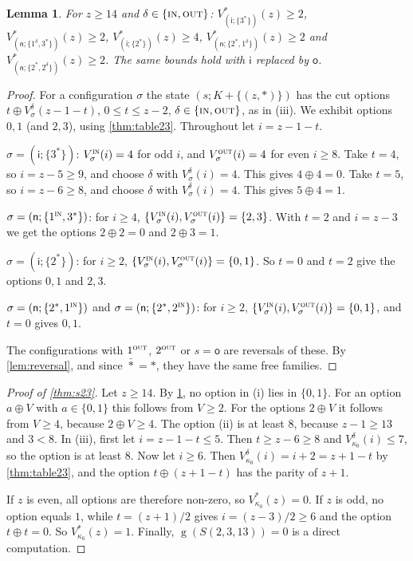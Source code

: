 \documentclass[11pt]{amsart}
\newtheorem{lemma}[theorem]{Lemma}
\theoremstyle{definition}
\theoremstyle{remark}
\newcommand{\gv}{\operatorname{g}}           %
\newcommand{\sn}{\mathsf{n}}
\newcommand{\si}{\mathsf{i}}
\newcommand{\so}{\mathsf{o}}
\newcommand{\Sp}{S}
\newcommand{\free}{\ast}
\newcommand{\IN}{\textup{\textsc{in}}}
\newcommand{\OUT}{\textup{\textsc{out}}}
\begin{document}
\begin{lemma}\label{lem:lowerbounds}
For $z\ge14$ and $\delta\in\{\IN,\OUT\}$:
$V^\free_{(\si;\{3^\free\})}(z)\ge2$, $V^\free_{(\sn;\{1^\delta,3^\free\})}(z)\ge2$, $V^\free_{(\si;\{2^\free\})}(z)\ge4$, $V^\free_{(\sn;\{2^\free,1^\delta\})}(z)\ge2$ and $V^\free_{(\sn;\{2^\free,2^\delta\})}(z)\ge2$. The same bounds hold with $\si$ replaced by $\so$.
\end{lemma}

\begin{proof}
For a configuration $\sigma$ the state $(s;K+\{(z,\free)\})$ has the cut options $t\oplus V^\delta_\sigma(z-1-t)$, $0\le t\le z-2$, $\delta\in\{\IN,\OUT\}$, as in (iii). We exhibit options $0,1$ (and $2,3$), using \cref{thm:table23}. Throughout let $i=z-1-t$.

$\sigma=(\si;\{3^\free\})$: $V^\IN_\sigma(i)=4$ for odd $i$, and $V^\OUT_\sigma(i)=4$ for even $i\ge8$. Take $t=4$, so $i=z-5\ge9$, and choose $\delta$ with $V^\delta_\sigma(i)=4$. This gives $4\oplus4=0$. Take $t=5$, so $i=z-6\ge8$, and choose $\delta$ with $V^\delta_\sigma(i)=4$. This gives $5\oplus4=1$.

$\sigma=(\sn;\{1^\IN,3^\free\})$: for $i\ge4$, $\{V^\IN_\sigma(i),V^\OUT_\sigma(i)\}=\{2,3\}$. With $t=2$ and $i=z-3$ we get the options $2\oplus2=0$ and $2\oplus3=1$.

$\sigma=(\si;\{2^\free\})$: for $i\ge2$, $\{V^\IN_\sigma(i),V^\OUT_\sigma(i)\}=\{0,1\}$. So $t=0$ and $t=2$ give the options $0,1$ and $2,3$.

$\sigma=(\sn;\{2^\free,1^\IN\})$ and $\sigma=(\sn;\{2^\free,2^\IN\})$: for $i\ge2$, $\{V^\IN_\sigma(i),V^\OUT_\sigma(i)\}=\{0,1\}$, and $t=0$ gives $0,1$.

The configurations with $1^\OUT$, $2^\OUT$ or $s=\so$ are reversals of these. By \cref{lem:reversal}, and since $\bar\free=\free$, they have the same free families.
\end{proof}

\begin{proof}[Proof of \cref{thm:s23}]
Let $z\ge14$. By \cref{lem:lowerbounds}, no option in (i) lies in $\{0,1\}$. For an option $a\oplus V$ with $a\in\{0,1\}$ this follows from $V\ge2$. For the options $2\oplus V$ it follows from $V\ge4$, because $2\oplus V\ge4$. The option (ii) is at least $8$, because $z-1\ge 13$ and $3<8$. In (iii), first let $i=z-1-t\le5$. Then $t\ge z-6\ge8$ and $V^\delta_{\kappa_0}(i)\le7$, so the option is at least $8$. Now let $i\ge6$. Then $V^\delta_{\kappa_0}(i)=i+2=z+1-t$ by \cref{thm:table23}, and the option $t\oplus(z+1-t)$ has the parity of $z+1$.

If $z$ is even, all options are therefore non-zero, so $V^\free_{\kappa_0}(z)=0$. If $z$ is odd, no option equals $1$, while $t=(z+1)/2$ gives $i=(z-3)/2\ge6$ and the option $t\oplus t=0$. So $V^\free_{\kappa_0}(z)=1$. Finally, $\gv(\Sp(2,3,13))=0$ is a direct computation.
\end{proof}
\end{document}

